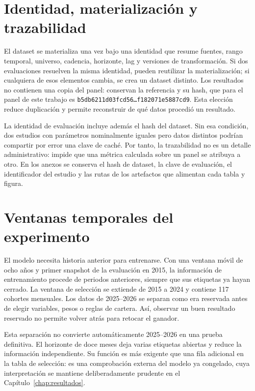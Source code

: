 \section{Identidad, materialización y trazabilidad}

El dataset se materializa una vez bajo una identidad que resume fuentes, rango temporal, universo,
cadencia, horizonte, lag y versiones de transformación. Si dos evaluaciones resuelven la misma
identidad, pueden reutilizar la materialización; si cualquiera de esos elementos cambia, se crea un
dataset distinto. Los resultados no contienen una copia del panel: conservan la referencia y su
hash, que para el panel de este trabajo es
\texttt{b5db6211d03fcd56\ldots{}f182071e5887cd9}. Esta elección reduce duplicación y permite
reconstruir de qué datos procedió un resultado.

La identidad de evaluación incluye además el hash del dataset. Sin esa condición, dos estudios con
parámetros nominalmente iguales pero datos distintos podrían compartir por error una clave de caché.
Por tanto, la trazabilidad no es un detalle administrativo: impide que una métrica calculada sobre
un panel se atribuya a otro. En los anexos se conserva el hash de dataset, la clave de evaluación,
el identificador del estudio y las rutas de los artefactos que alimentan cada tabla y figura.

\section{Ventanas temporales del experimento}

El modelo necesita historia anterior para entrenarse. Con una ventana móvil de ocho años y primer
snapshot de la evaluación en 2015, la información de entrenamiento procede de periodos anteriores,
siempre que sus etiquetas ya hayan cerrado. La ventana de selección se extiende de 2015 a 2024 y
contiene 117 cohortes mensuales. Los datos de 2025--2026 se separan como era reservada antes de
elegir variables, pesos o reglas de cartera. Así, observar un buen resultado reservado no permite
volver atrás para retocar el ganador.

Esta separación no convierte automáticamente 2025--2026 en una prueba definitiva. El horizonte de
doce meses deja varias etiquetas abiertas y reduce la información independiente. Su función es más
exigente que una fila adicional en la tabla de selección: es una comprobación externa del modelo ya
congelado, cuya interpretación se mantiene deliberadamente prudente en el Capítulo~\ref{chap:resultados}.

